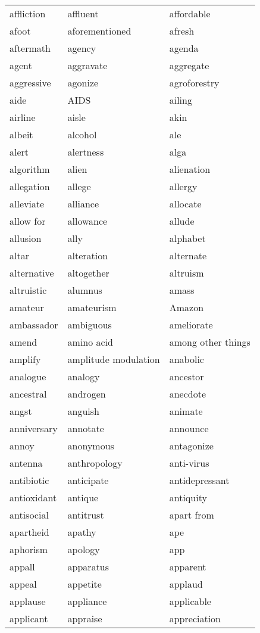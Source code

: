 \documentclass{minimal}
\begin{document}
\begin{longtable}{p{2.8cm}p{2.8cm}p{2.8cm}}
affliction & affluent & affordable \\
afoot & aforementioned & afresh \\
aftermath & agency & agenda \\
agent & aggravate & aggregate \\
aggressive & agonize & agroforestry \\
aide & AIDS & ailing \\
airline & aisle & akin \\
albeit & alcohol & ale \\
alert & alertness & alga \\
algorithm & alien & alienation \\
allegation & allege & allergy \\
alleviate & alliance & allocate \\
allow for & allowance & allude \\
allusion & ally & alphabet \\
altar & alteration & alternate \\
alternative & altogether & altruism \\
altruistic & alumnus & amass \\
amateur & amateurism & Amazon \\
ambassador & ambiguous & ameliorate \\
amend & amino acid & among other things \\
amplify & amplitude modulation & anabolic \\
analogue & analogy & ancestor \\
ancestral & androgen & anecdote \\
angst & anguish & animate \\
anniversary & annotate & announce \\
annoy & anonymous & antagonize \\
antenna & anthropology & anti-virus \\
antibiotic & anticipate & antidepressant \\
antioxidant & antique & antiquity \\
antisocial & antitrust & apart from \\
apartheid & apathy & ape \\
aphorism & apology & app \\
appall & apparatus & apparent \\
appeal & appetite & applaud \\
applause & appliance & applicable \\
applicant & appraise & appreciation \\

\end{longtable}
\end{document}
